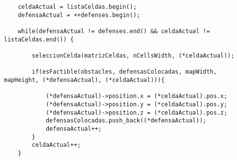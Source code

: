 \begin{lstlisting}
	celdaActual = listaCeldas.begin();
	defensaActual = ++defenses.begin();

	while(defensaActual != defenses.end() && celdaActual != listaCeldas.end()) {

		seleccionCelda(matrizCeldas, nCellsWidth, (*celdaActual));	

		if(esFactible(obstacles, defensasColocadas, mapWidth, mapHeight, (*defensaActual), (*celdaActual))){

			(*defensaActual)->position.x = (*celdaActual).pos.x;
			(*defensaActual)->position.y = (*celdaActual).pos.y;
			(*defensaActual)->position.z = (*celdaActual).pos.z;
            defensasColocadas.push_back((*defensaActual));
			defensaActual++;
		}
		celdaActual++;
	}
\end{lstlisting}